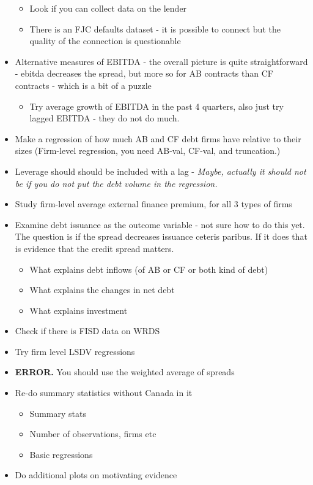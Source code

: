 \documentclass[12pt]{article}
\begin{document}
\begin{itemize}
\begin{itemize}
        \item Look if you can collect data on the lender 
        \item There is an FJC defaults dataset - it is possible to connect but the quality of the connection is questionable \checkmark
    \end{itemize} 
    \item Alternative measures of EBITDA \checkmark - the overall picture is quite straightforward - ebitda decreases the spread, but more so for AB contracts than CF contracts - which is a bit of a puzzle 
    \begin{itemize}
        \item Try average growth of EBITDA in the past 4 quarters, also just try lagged EBITDA - they do not do much. \checkmark
    \end{itemize}
    \item Make a regression of how much AB and CF debt firms have relative to their sizes (Firm-level regression, you need AB-val, CF-val, and truncation.) \checkmark
    \item Leverage should should be included with a lag - \textit{Maybe, actually it should not be if you do not put the debt volume in the regression.} \checkmark
    \item Study firm-level average external finance premium, for all 3 types of firms \checkmark
    \item Examine debt issuance as the outcome variable - not sure how to do this yet. The question is if the spread decreases issuance ceteris paribus. If it does that is evidence that the credit spread matters. \checkmark
    \begin{itemize} \setlength\itemsep{0em} \small
        \item What explains debt inflows (of AB or CF or both kind of debt) \checkmark
        \item What explains the changes in net debt \checkmark
        \item What explains investment \checkmark
    \end{itemize}
    \item Check if there is FISD data on WRDS \checkmark
    \item Try firm level LSDV regressions \checkmark
    \item \textbf{ERROR.} You should use the weighted average of spreads \checkmark
    \item Re-do summary statistics without Canada in it \checkmark 
    \begin{itemize} \setlength\itemsep{0em}
        \item Summary stats \checkmark
        \item Number of observations, firms etc \checkmark
        \item Basic regressions \checkmark
    \end{itemize}
    \item Do additional plots on motivating evidence \checkmark
\end{itemize} \normalsize
\end{document}
